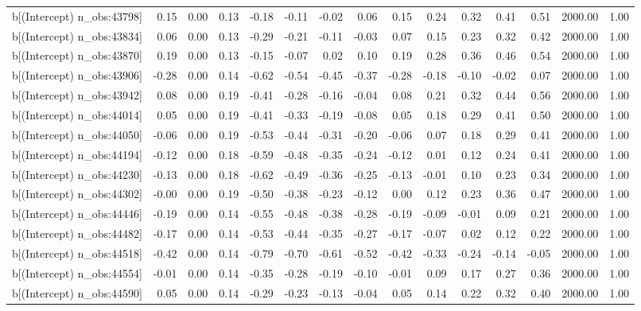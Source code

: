 \begin{table}[ht]
\begin{tabular}{rrrrrrrrrrrrrrr}
  b[(Intercept) n\_obs:43798] & 0.15 & 0.00 & 0.13 & -0.18 & -0.11 & -0.02 & 0.06 & 0.15 & 0.24 & 0.32 & 0.41 & 0.51 & 2000.00 & 1.00 \\ 
  b[(Intercept) n\_obs:43834] & 0.06 & 0.00 & 0.13 & -0.29 & -0.21 & -0.11 & -0.03 & 0.07 & 0.15 & 0.23 & 0.32 & 0.42 & 2000.00 & 1.00 \\ 
  b[(Intercept) n\_obs:43870] & 0.19 & 0.00 & 0.13 & -0.15 & -0.07 & 0.02 & 0.10 & 0.19 & 0.28 & 0.36 & 0.46 & 0.54 & 2000.00 & 1.00 \\ 
  b[(Intercept) n\_obs:43906] & -0.28 & 0.00 & 0.14 & -0.62 & -0.54 & -0.45 & -0.37 & -0.28 & -0.18 & -0.10 & -0.02 & 0.07 & 2000.00 & 1.00 \\ 
  b[(Intercept) n\_obs:43942] & 0.08 & 0.00 & 0.19 & -0.41 & -0.28 & -0.16 & -0.04 & 0.08 & 0.21 & 0.32 & 0.44 & 0.56 & 2000.00 & 1.00 \\ 
  b[(Intercept) n\_obs:44014] & 0.05 & 0.00 & 0.19 & -0.41 & -0.33 & -0.19 & -0.08 & 0.05 & 0.18 & 0.29 & 0.41 & 0.50 & 2000.00 & 1.00 \\ 
  b[(Intercept) n\_obs:44050] & -0.06 & 0.00 & 0.19 & -0.53 & -0.44 & -0.31 & -0.20 & -0.06 & 0.07 & 0.18 & 0.29 & 0.41 & 2000.00 & 1.00 \\ 
  b[(Intercept) n\_obs:44194] & -0.12 & 0.00 & 0.18 & -0.59 & -0.48 & -0.35 & -0.24 & -0.12 & 0.01 & 0.12 & 0.24 & 0.41 & 2000.00 & 1.00 \\ 
  b[(Intercept) n\_obs:44230] & -0.13 & 0.00 & 0.18 & -0.62 & -0.49 & -0.36 & -0.25 & -0.13 & -0.01 & 0.10 & 0.23 & 0.34 & 2000.00 & 1.00 \\ 
  b[(Intercept) n\_obs:44302] & -0.00 & 0.00 & 0.19 & -0.50 & -0.38 & -0.23 & -0.12 & 0.00 & 0.12 & 0.23 & 0.36 & 0.47 & 2000.00 & 1.00 \\ 
  b[(Intercept) n\_obs:44446] & -0.19 & 0.00 & 0.14 & -0.55 & -0.48 & -0.38 & -0.28 & -0.19 & -0.09 & -0.01 & 0.09 & 0.21 & 2000.00 & 1.00 \\ 
  b[(Intercept) n\_obs:44482] & -0.17 & 0.00 & 0.14 & -0.53 & -0.44 & -0.35 & -0.27 & -0.17 & -0.07 & 0.02 & 0.12 & 0.22 & 2000.00 & 1.00 \\ 
  b[(Intercept) n\_obs:44518] & -0.42 & 0.00 & 0.14 & -0.79 & -0.70 & -0.61 & -0.52 & -0.42 & -0.33 & -0.24 & -0.14 & -0.05 & 2000.00 & 1.00 \\ 
  b[(Intercept) n\_obs:44554] & -0.01 & 0.00 & 0.14 & -0.35 & -0.28 & -0.19 & -0.10 & -0.01 & 0.09 & 0.17 & 0.27 & 0.36 & 2000.00 & 1.00 \\ 
  b[(Intercept) n\_obs:44590] & 0.05 & 0.00 & 0.14 & -0.29 & -0.23 & -0.13 & -0.04 & 0.05 & 0.14 & 0.22 & 0.32 & 0.40 & 2000.00 & 1.00 \\ 

\end{tabular}
\end{table}
